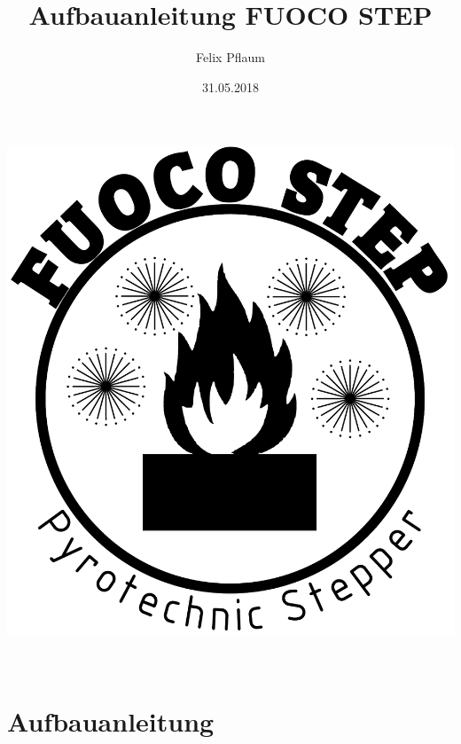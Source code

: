 \documentclass[paper=a4, open=any]{scrbook}
\title{Aufbauanleitung FUOCO STEP}
\author{Felix Pflaum}
\date{31.05.2018}
\begin{document}
	\begin{titlepage}
		\vspace*{\fill}
		\begin{center}
			\includegraphics[width=\textwidth]{logo}
		\end{center}
		\vfill
		\begin{center}{\fontsize{40pt}{40pt} } \\ \vfill
			{\fontsize{24pt}{24pt} }
		\end{center}
		\vfill
	\end{titlepage}
	\part{Aufbauanleitung}
\end{document}
